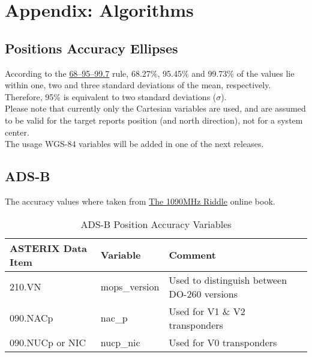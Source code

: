 \section{Appendix: Algorithms}
\label{sec:appendix_algorithms}  

\subsection{Positions Accuracy Ellipses}
\label{sec:algo_position_accuracy_ellipses} 

According to the \href{https://en.wikipedia.org/wiki/68%E2%80%9395%E2%80%9399.7_rule}{68–95–99.7} rule, 68.27\%, 95.45\% and 99.73\% of the values lie within one, two and three standard deviations of the mean, respectively. \\

Therefore, 95\% is equivalent to two standard deviations ($\sigma$). \\

Please note that currently only the Cartesian variables are used, and are assumed to be valid for the target reports position (and north direction), not for a system center. \\

The usage WGS-84 variables will be added in one of the next releases.

\subsection{ADS-B}

The accuracy values where taken from \href{https://mode-s.org/decode/adsb/uncertainty.html}{The 1090MHz Riddle} online book.

\begin{center}
 \begin{table}[H]
  \begin{tabularx}{\textwidth}{ | X | l | l | }
    \hline
    \textbf{ASTERIX Data Item} & \textbf{Variable} & \textbf{Comment} \\ \hline
    210.VN & mops\_version & Used to distinguish between DO-260 versions \\ \hline
    090.NACp & nac\_p  & Used for V1 \& V2 transponders \\ \hline
    090.NUCp or NIC & nucp\_nic  & Used for V0 transponders \\ \hline
  \end{tabularx}
  \caption{ADS-B Position Accuracy Variables}
\end{table}
\end{center}

